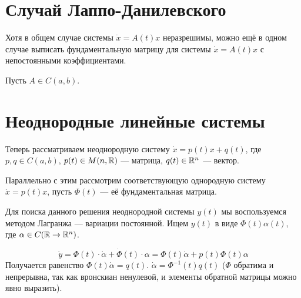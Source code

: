 \documentclass[a4paper]{report}
\begin{document}
    \section{Случай Лаппо-Данилевского}
    Хотя в общем случае системы $\dot{x} = A(t)x$ неразрешимы, можно ещё в одном случае выписать фундаментальную матрицу для системы $\dot{x} = A(t) x$ с непостоянными коэффициентами.

    Пусть $A \in C(a, b)$.
    \section{Неоднородные линейные системы}
    Теперь рассматриваем неоднородную систему $\dot{x} = p(t)x + q(t)$, где $p, q \in C(a, b)$, $p(t) \in M(n, \mathbb{R})$ --- матрица, $q(t) \in \mathbb{R}^n$ --- вектор.

    Параллельно с этим рассмотрим соответствующую однородную систему $\dot{x} = p(t)x$, пусть $\Phi(t)$ --- её фундаментальная матрица.

    Для поиска данного решения неоднородной системы $y(t)$ мы воспользуемся методом Лагранжа --- вариации постоянной.
    Ищем $y(t)$ в виде $\Phi(t)\alpha(t)$, где $\alpha \in C(\mathbb{R} \to \mathbb{R}^n)$.

    \[\dot{y} = \Phi(t)\cdot\dot{\alpha} + \dot{\Phi}(t)\cdot \alpha = \Phi(t)\dot{\alpha} + p(t)\Phi(t)\alpha\]
    Получается равенство $\Phi(t)\dot{\alpha} = q(t)$. $\dot{\alpha} = \Phi^{-1}(t)q(t)$ ($\Phi$ обратима и непрерывна, так как вронскиан ненулевой, и элементы обратной матрицы можно явно выразить).
    
\end{document}
